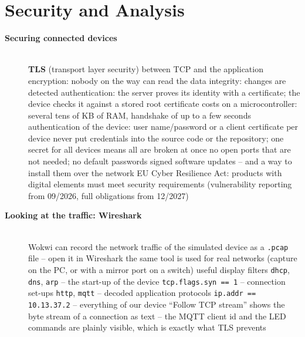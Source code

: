 \section{Security and Analysis}

\begin{description}
\item[{\rot\bf Securing connected devices}]~\\[-\lblskip]
\bi
	\ite \textbf{TLS} (transport layer security) between TCP and the application
	\bi
		\ite encryption: nobody on the way can read the data
		\ite integrity: changes are detected
		\ite authentication: the server proves its identity with a certificate; the device checks it against a stored root certificate
		\ite costs on a microcontroller: several tens of KB of RAM, handshake of up to a few seconds
	\ei
	\ite authentication of the device: user name/password or a client certificate per device
	\ite never put credentials into the source code or the repository; one secret for all devices means all are broken at once
	\ite no open ports that are not needed; no default passwords
	\ite signed software updates -- and a way to install them over the network
	\ite EU Cyber Resilience Act: products with digital elements must meet security requirements (vulnerability reporting from 09/2026, full obligations from 12/2027)
\ei
\os{\newpage}

\item[{\rot\bf Looking at the traffic: Wireshark}]~\\[-\lblskip]
\bi
	\ite Wokwi can record the network traffic of the simulated device as a \texttt{.pcap} file -- open it in Wireshark
	\ite the same tool is used for real networks (capture on the PC, or with a mirror port on a switch)
	\ite useful display filters
	\bi
		\ite \texttt{dhcp}, \texttt{dns}, \texttt{arp} -- the start-up of the device
		\ite \texttt{tcp.flags.syn == 1} -- connection set-ups
		\ite \texttt{http}, \texttt{mqtt} -- decoded application protocols
		\ite \texttt{ip.addr == 10.13.37.2} -- everything of our device
	\ei
	\ite ``Follow TCP stream'' shows the byte stream of a connection as text -- the MQTT client id and the LED commands are plainly visible, which is exactly what TLS prevents
\ei
\os{\newpage}


\end{description}
